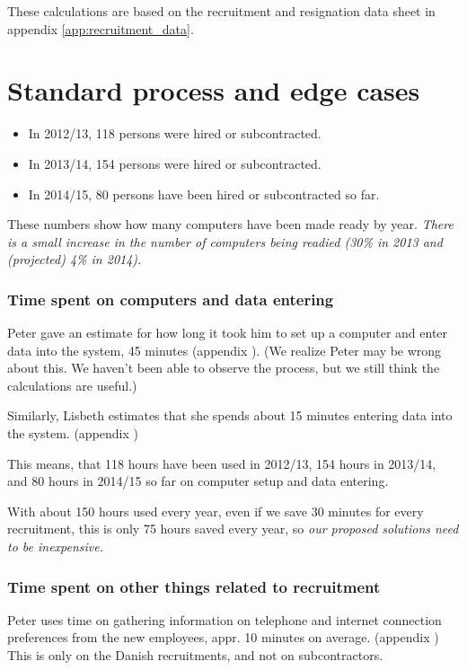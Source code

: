 \label{app:time_spent_on_the_problem}
These calculations are based on the recruitment and resignation data sheet in appendix \ref{app:recruitment_data}.

\section{Standard process and edge cases}
\begin{itemize}
\item In 2012/13, 118 persons were hired or subcontracted.
\item In 2013/14, 154 persons were hired or subcontracted.
\item In 2014/15, 80 persons have been hired or subcontracted so far.
\end{itemize}
These numbers show how many computers have been made ready by year. 
\emph{There is a small increase in the number of computers being readied (30\% in 2013 and (projected) 4\% in 2014).}

\subsubsection{Time spent on computers and data entering}
Peter gave an estimate for how long it took him to set up a computer and enter data into the system, 45 minutes (appendix ). (We realize Peter may be wrong about this. We haven't been able to observe the process, but we still think the calculations are useful.)

Similarly, Lisbeth estimates that she spends about 15 minutes entering data into the system. (appendix )

This means, that 118 hours have been used in 2012/13, 154 hours in 2013/14, and 80 hours in 2014/15 so far on computer setup and data entering.

With about 150 hours used every year, even if we save 30 minutes for every recruitment, this is only 75 hours saved every year, so \emph{our proposed solutions need to be inexpensive.}

\subsubsection{Time spent on other things related to recruitment}
Peter uses time on gathering information on telephone and internet connection preferences from the new employees, appr. 10 minutes on average.
(appendix )
This is only on the Danish recruitments, and not on subcontractors.

